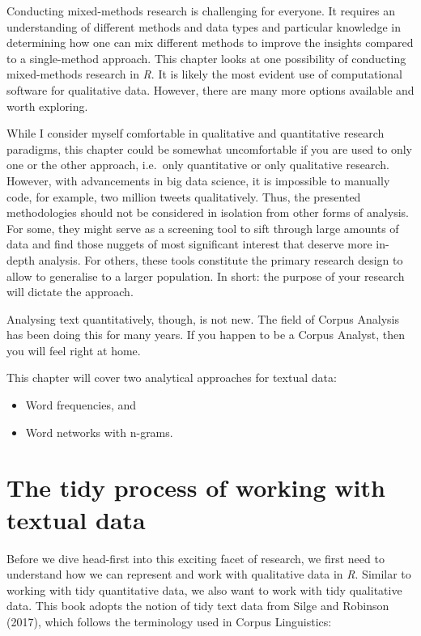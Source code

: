 \documentclass[
  letterpaper,
]{krantz}
\begin{document}
Conducting mixed-methods research is challenging for everyone. It
requires an understanding of different methods and data types and
particular knowledge in determining how one can mix different methods to
improve the insights compared to a single-method approach. This chapter
looks at one possibility of conducting mixed-methods research in
\emph{R}. It is likely the most evident use of computational software
for qualitative data. However, there are many more options available and
worth exploring.

While I consider myself comfortable in qualitative and quantitative
research paradigms, this chapter could be somewhat uncomfortable if you
are used to only one or the other approach, i.e.~only quantitative or
only qualitative research. However, with advancements in big data
science, it is impossible to manually code, for example, two million
tweets qualitatively. Thus, the presented methodologies should not be
considered in isolation from other forms of analysis. For some, they
might serve as a screening tool to sift through large amounts of data
and find those nuggets of most significant interest that deserve more
in-depth analysis. For others, these tools constitute the primary
research design to allow to generalise to a larger population. In short:
the purpose of your research will dictate the approach.

Analysing text quantitatively, though, is not new. The field of Corpus
Analysis has been doing this for many years. If you happen to be a
Corpus Analyst, then you will feel right at home.

This chapter will cover two analytical approaches for textual data:

\begin{itemize}
\item
  Word frequencies, and
\item
  Word networks with n-grams.
\end{itemize}

\section{The tidy process of working with textual
data}\label{sec-tidy-process-for-textual-data}

Before we dive head-first into this exciting facet of research, we first
need to understand how we can represent and work with qualitative data
in \emph{R}. Similar to working with tidy quantitative data, we also
want to work with tidy qualitative data. This book adopts the notion of
tidy text data from Silge and Robinson (2017), which follows the
terminology used in Corpus Linguistics:
\end{document}
